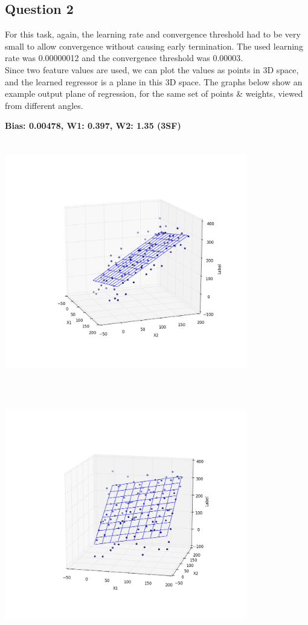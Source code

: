 \documentclass{article}
\begin{document}
\subsection*{Question 2}
For this task, again, the learning rate and convergence threshold had to be very small to allow convergence without causing early termination. The used learning rate was 0.00000012 and the convergence threshold was 0.00003. \\
\indent Since two feature values are used, we can plot the values as points in 3D space, and the learned regressor is a plane in this 3D space. The graphs below show an example output plane of regression, for the same set of points \& weights, viewed from different angles.

\begin{center}
\textbf{Bias: 0.00478, W1: 0.397, W2: 1.35 (3SF)}\\
\centerline{\includegraphics[width=400px, height=400px]{partB2_1}}
\vspace{2mm}
\centerline{\includegraphics[width=400px, height=400px]{partB2_2}}

\end{center}
\end{document}
